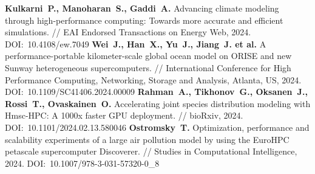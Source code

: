 \begin{thebibliography}{99}
\textbf{Kulkarni~P., Manoharan~S., Gaddi~A.} Advancing climate modeling through high-performance computing: Towards more accurate and efficient simulations. // EAI Endorsed Transactions on Energy Web, 2024. DOI:~10.4108/ew.7049
\textbf{Wei~J., Han~X., Yu~J., Jiang~J. et al.} A performance-portable kilometer-scale global ocean model on ORISE and new Sunway heterogeneous supercomputers. // International Conference for High Performance Computing, Networking, Storage and Analysis, Atlanta, US, 2024. DOI:~10.1109/SC41406.2024.00009
\textbf{Rahman~A., Tikhonov~G., Oksanen~J., Rossi~T., Ovaskainen~O.} Accelerating joint species distribution modeling with Hmsc-HPC: A 1000x faster GPU deployment. // bioRxiv, 2024. DOI:~10.1101/2024.02.13.580046
\textbf{Ostromsky~T.} Optimization, performance and scalability experiments of a large air pollution model by using the EuroHPC petascale supercomputer Discoverer. // Studies in Computational Intelligence, 2024. DOI:~10.1007/978-3-031-57320-0\_8




\end{thebibliography}

